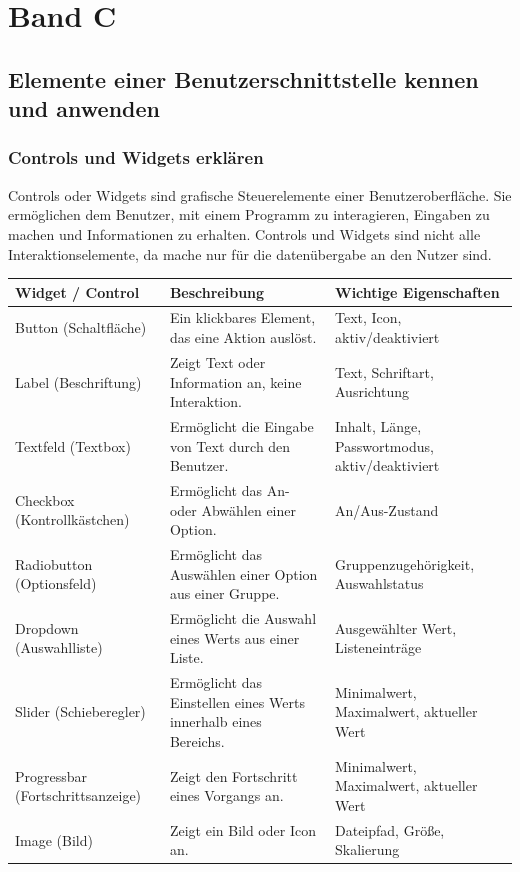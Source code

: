 \documentclass[10pt]{article}
\newcounter{subsubsubsection}[subsubsection]
\begin{document}
	\pagebreak
	
		\section{Band C}
	\subsection{Elemente einer Benutzerschnittstelle kennen und anwenden}
	\subsubsection{Controls und Widgets erklären}
	Controls oder Widgets sind grafische Steuerelemente einer Benutzeroberfläche. Sie ermöglichen dem Benutzer, mit einem Programm zu interagieren, Eingaben zu machen und Informationen zu erhalten. Controls und Widgets sind nicht alle Interaktionselemente, da mache nur für die datenübergabe an den Nutzer sind.
	
	\begin{tabular}{@{}lll@{}}
		\toprule
		\textbf{Widget / Control} & \textbf{Beschreibung} & \textbf{Wichtige Eigenschaften} \\
		\midrule
		Button (Schaltfläche) & Ein klickbares Element, das eine Aktion auslöst. & Text, Icon, aktiv/deaktiviert \\
		Label (Beschriftung) & Zeigt Text oder Information an, keine Interaktion. & Text, Schriftart, Ausrichtung \\
		Textfeld (Textbox) & Ermöglicht die Eingabe von Text durch den Benutzer. & Inhalt, Länge, Passwortmodus, aktiv/deaktiviert \\
		Checkbox (Kontrollkästchen) & Ermöglicht das An- oder Abwählen einer Option. & An/Aus-Zustand \\
		Radiobutton (Optionsfeld) & Ermöglicht das Auswählen einer Option aus einer Gruppe. & Gruppenzugehörigkeit, Auswahlstatus \\
		Dropdown (Auswahlliste) & Ermöglicht die Auswahl eines Werts aus einer Liste. & Ausgewählter Wert, Listeneinträge \\
		Slider (Schieberegler) & Ermöglicht das Einstellen eines Werts innerhalb eines Bereichs. & Minimalwert, Maximalwert, aktueller Wert \\
		Progressbar (Fortschrittsanzeige) & Zeigt den Fortschritt eines Vorgangs an. & Minimalwert, Maximalwert, aktueller Wert \\
		Image (Bild) & Zeigt ein Bild oder Icon an. & Dateipfad, Größe, Skalierung \\
		\bottomrule
	\end{tabular}
	
\end{document}
